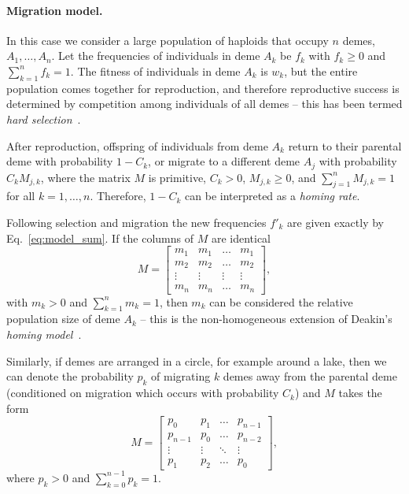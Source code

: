 \documentclass[12pt, twocolumn]{extarticle}
\begin{document}
\paragraph*{Migration model.}\label{sec:mig_model}

In this case we consider a large population of haploids that occupy $n$ demes, $A_1, \ldots, A_n$.
Let the frequencies of individuals in deme $A_k$ be $f_k$ with $f_k \ge 0$ and $\sum_{k=1}^{n}{f_k} = 1$.
The fitness of individuals in deme $A_k$ is $w_k$, but the entire population comes together for reproduction, and therefore reproductive success is determined by competition among individuals of all demes -- this has been termed \emph{hard selection}~\citep{Wallace1975,Karlin1982}.

After reproduction, offspring of individuals from deme $A_k$ return to their parental deme with probability $1-C_k$, or migrate to a different deme $A_j$ with probability $C_k M_{j,k}$, where the matrix $M$ is primitive, $C_k > 0$, $M_{j,k} \ge 0$, and $\sum_{j=1}^{n}{M_{j,k}} = 1$ for all $k=1, \ldots, n$.
Therefore, $1-C_k$ can be interpreted as a \emph{homing rate}.

Following selection and migration the new frequencies $f'_k$ are given exactly by Eq.~\ref{eq:model_sum}.
If the columns of ${M}$ are identical
\begin{equation}
{M} = \begin{bmatrix}
m_1 & m_1 & \ldots & m_1 \\
m_2 & m_2 & \ldots & m_2 \\
\vdots & \vdots & \vdots & \vdots \\
m_n & m_n & \ldots & m_n
\end{bmatrix},
\end{equation}
with $m_k>0$ and $\sum_{k=1}^{n}{m_k}=1$,
then $m_k$ can be considered the relative population size of deme $A_k$ --
this is the non-homogeneous extension of Deakin's \emph{homing model}~\citep{Deakin1966,Karlin1982}.

Similarly, if demes are arranged in a circle, for example around a lake, 
then we can denote the probability $p_k$ of migrating $k$ demes away from the parental deme (conditioned on migration which occurs with probability $C_k$)
and ${M}$ takes the form
\begin{equation}
{M} = \begin{bmatrix}
p_0 & p_1 & \ldots & p_{n-1} \\
p_{n-1} & p_0 & \ldots & p_{n-2} \\
\vdots & \vdots & \ddots & \vdots \\
p_1 & p_2 & \ldots & p_0
\end{bmatrix},
\end{equation}
where $p_k > 0$ and $\sum_{k=0}^{n-1}{p_k}=1$.
\end{document}

